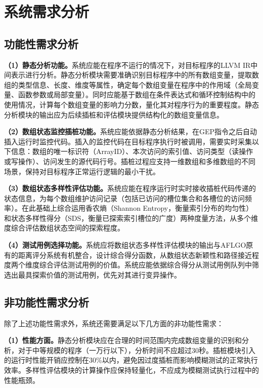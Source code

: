 \documentclass[bachelor]{njupthesis}
\begin{document}
\section{系统需求分析}

\subsection{功能性需求分析}

\textbf{（1）静态分析功能。}系统应能在程序不运行的情况下，对目标程序的LLVM IR中间表示进行分析。静态分析模块需要准确识别目标程序中的所有数组变量，提取数组的类型信息、长度、维度等属性，确定每个数组变量在程序中的作用域（全局变量、函数参数或局部变量）。同时应能基于数组在条件表达式和循环控制结构中的使用情况，计算每个数组变量的影响力分数，量化其对程序行为的重要程度。静态分析模块的输出应为后续插桩和评估模块提供结构化的数组变量信息。

\textbf{（2）数组状态监控插桩功能。}系统应能依据静态分析结果，在GEP指令之后自动插入运行时监控代码。插入的监控代码在目标程序执行时被调用，需要实时采集以下信息：数组的唯一标识符（ArrayID）、本次访问的索引值、访问类型（读操作或写操作）、访问发生的源代码行号。插桩过程应支持一维数组和多维数组的不同场景，保持对目标程序正常运行逻辑的最小干扰。

\textbf{（3）数组状态多样性评估功能。}系统应能在程序运行时实时接收插桩代码传递的状态信息，为每个数组维护访问记录（包括已访问的槽位集合和各槽位的访问频率）。在此基础上综合运用香农熵（Shannon Entropy，衡量索引分布的均匀性）和状态多样性得分（SDS，衡量已探索索引槽位的广度）两种度量方法，从多个维度综合评估数组状态空间的探索程度。

\textbf{（4）测试用例选择功能。}系统应将数组状态多样性评估模块的输出与AFLGO原有的距离评分系统有机整合，设计综合得分函数，从数组状态新颖性和路径接近程度两个维度综合评估测试用例的价值。系统应能依据综合得分从测试用例队列中筛选出最具探索价值的测试用例，优先对其进行变异操作。

\subsection{非功能性需求分析}

除了上述功能性需求外，系统还需要满足以下几方面的非功能性需求：

\textbf{（1）性能方面。}静态分析模块应在合理的时间范围内完成数组变量的识别和分析，对于中等规模的程序（一万行以下），分析时间不应超过30秒。插桩模块引入的运行时性能开销应控制在30\%以内，避免因过度插桩而影响模糊测试的正常执行效率。多样性评估模块的计算操作应保持轻量化，不应成为模糊测试执行过程中的性能瓶颈。
\end{document}

